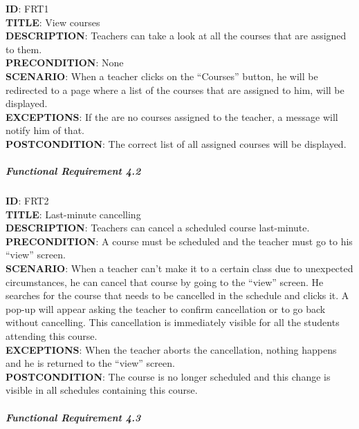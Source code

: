 \documentclass[9pt]{article}
\begin{document}
\textbf{ID}: FRT1\\\textbf{TITLE}: View courses\\\textbf{DESCRIPTION}:
Teachers can take a look at all the courses that are assigned to
them.\\\textbf{PRECONDITION}: None\\\textbf{SCENARIO}: When a teacher
clicks on the ``Courses'' button, he will be redirected to a page where
a list of the courses that are assigned to him, will be
displayed.\\\textbf{EXCEPTIONS}: If the are no courses assigned to the
teacher, a message will notify him of that.\\\textbf{POSTCONDITION}: The
correct list of all assigned courses will be displayed.

\subparagraph{Functional Requirement
4.2}\label{functional-requirement-4.2}

\textbf{ID}: FRT2\\\textbf{TITLE}: Last-minute
cancelling\\\textbf{DESCRIPTION}: Teachers can cancel a scheduled course
last-minute.\\\textbf{PRECONDITION}: A course must be scheduled and the
teacher must go to his ``view'' screen.\\\textbf{SCENARIO}: When a
teacher can't make it to a certain class due to unexpected
circumstances, he can cancel that course by going to the ``view''
screen. He searches for the course that needs to be cancelled in the
schedule and clicks it. A pop-up will appear asking the teacher to
confirm cancellation or to go back without cancelling. This cancellation
is immediately visible for all the students attending this
course.\\\textbf{EXCEPTIONS}: When the teacher aborts the cancellation,
nothing happens and he is returned to the ``view''
screen.\\\textbf{POSTCONDITION}: The course is no longer scheduled and
this change is visible in all schedules containing this course.

\subparagraph{Functional Requirement
4.3}\label{functional-requirement-4.3}
\end{document}
